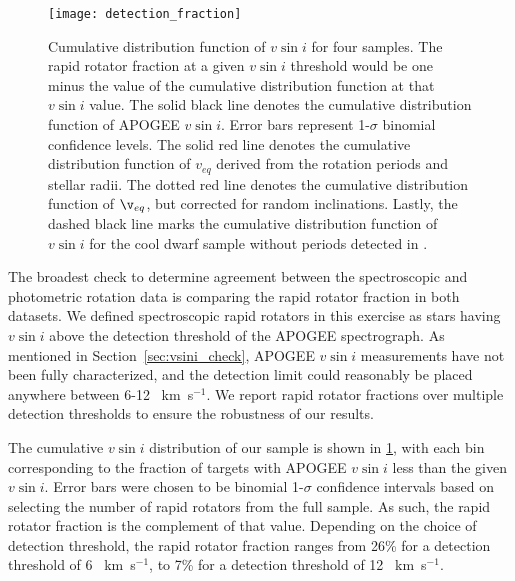 \documentclass[manuscript]{aastex6}
\newcommand{\vsini}{\ensuremath{v \sin i}}
\newcommand{\kms}{\textrm{~km~s}\ensuremath{^{-1}}}
\begin{document}
\begin{figure}[htb]
    \centering
    \texttt{[image: detection\_fraction]}
    \caption{Cumulative distribution function of \vsini{} for four
    samples. The rapid rotator fraction at a given \vsini{} threshold
    would be one minus the value of the cumulative distribution function
    at that \vsini{} value. The solid black line denotes the cumulative
    distribution function of APOGEE \vsini{}. Error bars represent 
    1-\(\sigma\) binomial confidence levels. The solid red line denotes
    the cumulative distribution function of \(v_{eq}\) derived from the
    rotation periods and stellar radii. The dotted red line denotes the
    cumulative distribution function of \(\v_{eq}\), but corrected for
    random inclinations. Lastly, the dashed black line marks the
    cumulative distribution function of \vsini{} for the cool dwarf
    sample without periods detected in 
    \citet{McQuillan14}.\label{fig:detection_fraction}}
\end{figure}

The broadest check to determine agreement between the spectroscopic
and photometric rotation data is comparing the rapid rotator fraction
in both datasets. We defined spectroscopic rapid rotators in this exercise as 
stars having \vsini{} above the detection threshold of the APOGEE 
spectrograph. As mentioned in 
Section~\ref{sec:vsini_check}, APOGEE \vsini{} measurements have not been fully
characterized, and the detection limit could reasonably be placed anywhere 
between 6-12 \kms{}. We report rapid rotator fractions over multiple detection 
thresholds to ensure the robustness of our results.

The cumulative \vsini{} distribution of our sample is shown in
\cref{fig:detection_fraction}, with each bin corresponding to the
fraction of targets with APOGEE \vsini{} less than the given
\vsini{}. Error bars were chosen to be binomial 1-\(\sigma\) confidence 
intervals based on selecting the number of rapid rotators from the full 
sample.  As such, the rapid rotator fraction is the complement of that
value. Depending on the choice of detection threshold, the rapid rotator 
fraction ranges from 26\% for a detection threshold of 6 \kms, to 7\%
for a detection threshold of 12 \kms.
\end{document}
